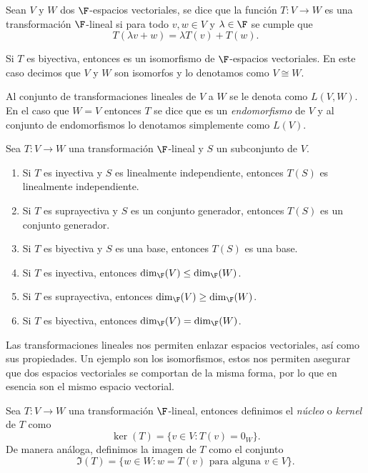 \begin{defi}
  Sean $V$ y $W$ dos $\F$-espacios vectoriales, se dice que la función $T\colon V\to W$ es una transformación $\F$-lineal si para todo $v,w \in V$ y $\lambda \in \F$ se cumple que 
  \[ T(\lambda v + w) = \lambda T(v) + T(w).\]

  Si $T$ es biyectiva, entonces es un isomorfismo de $\F$-espacios vectoriales. En este caso decimos que $V$ y $W$ son isomorfos y lo denotamos como $V \cong W$.
\end{defi}

Al conjunto de transformaciones lineales de $V$ a $W$ se le denota como $L(V,W)$. En el caso que $W = V$ entonces $T$ se dice que es un \emph{endomorfismo} de $V$ y al conjunto de endomorfismos lo denotamos simplemente como $L(V)$.

\begin{teor}
  Sea $T\colon V \to W$ una transformación $\F$-lineal y $S$ un subconjunto de $V$.
  \begin{enumerate}
    \item Si $T$ es inyectiva y $S$ es linealmente independiente, entonces $T(S)$ es linealmente independiente.
    \item Si $T$ es suprayectiva y $S$ es un conjunto generador, entonces $T(S)$ es un conjunto generador.
    \item Si $T$ es biyectiva y $S$ es una base, entonces $T(S)$ es una base.
    \item Si $T$ es inyectiva, entonces $\dim_\F (V) \leq \dim_\F(W)$.
    \item Si $T$ es suprayectiva, entonces $\dim_\F (V) \geq \dim_\F(W)$.
    \item Si $T$ es biyectiva, entonces $\dim_\F (V) = \dim_\F(W)$.
  \end{enumerate}
\end{teor}

Las transformaciones lineales nos permiten enlazar espacios vectoriales, así como sus propiedades. Un ejemplo son los isomorfismos, estos nos permiten asegurar que dos espacios vectoriales se comportan de la misma forma, por lo que en esencia son el mismo espacio vectorial.

\begin{defi}
  Sea $T\colon V \to W$ una transformación $\F$-lineal, entonces definimos el \emph{núcleo} o \emph{kernel}  de $T$ como
    \[ \ker(T) = \{ v \in V : T(v) = 0_W \}.\]
  De manera análoga, definimos la imagen de $T$ como el conjunto
    \[ \Im(T) = \{w \in W : w = T(v) \text{ para alguna } v \in V \}. \]
\end{defi}

